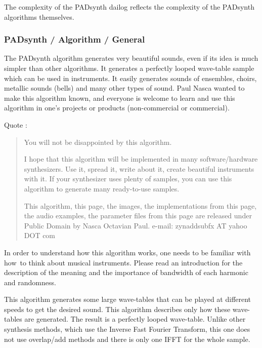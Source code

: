    The complexity of the PADsynth dailog reflects the complexity of the
   PADsynth algorithms themselves.

\subsubsection{PADsynth / Algorithm / General}
\label{subsubsec:padsynth_algorithm_general}

   The PADsynth algorithm generates very beautiful sounds, even if its idea is
   much simpler than other algorithms. It generates a perfectly looped
   wave-table sample which can be used in instruments. It easily generates
   sounds of ensembles, choirs, metallic sounds (bells) and many other types of
   sound.  Paul Nasca wanted to make this algorithm known, and everyone is
   welcome to learn and use this algorithm in one's projects or products
   (non-commercial or commercial).

   Quote \cite{zyndoc}:

   \begin{quotation}
      You will not be disappointed by this algorithm.

      I hope that this algorithm will be implemented in many software/hardware
      synthesizers. Use it, spread it, write about it, create beautiful
      instruments with it. If your synthesizer uses plenty of samples, you can
      use this algorithm to generate many ready-to-use samples.

      This algorithm, this page, the images, the implementations from this
      page, the audio examples, the parameter files from this page
      are released under Public Domain by Nasca Octavian Paul.
      e-mail: zynaddsubfx AT yahoo DOT com
   \end{quotation}

   In order to understand how this algorithm works, one needs to be familiar
   with how to think about musical instruments. Please read an introduction
   for the description of the meaning and the importance of bandwidth of each
   harmonic and randomness.

   This algorithm generates some large wave-tables that can be played at
   different speeds to get the desired sound. This algorithm describes only
   how these wave-tables are generated. The result is a perfectly looped
   wave-table.  Unlike other synthesis methods, which use the
   Inverse Fast Fourier Transform, this one does not use overlap/add methods
   and there is only one IFFT for the whole sample.


